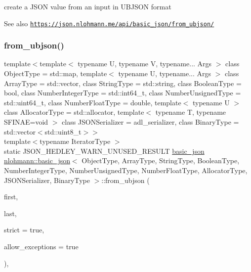 create a J\+S\+ON value from an input in U\+B\+J\+S\+ON format 

\begin{DoxySeeAlso}{See also}
\href{https://json.nlohmann.me/api/basic_json/from_ubjson/}{\tt https\+://json.\+nlohmann.\+me/api/basic\+\_\+json/from\+\_\+ubjson/} 
\end{DoxySeeAlso}
\mbox{\label{classnlohmann_1_1basic__json_a9dbb422350fed520ce8c1ca8762c0251}} 
\subsubsection{\texorpdfstring{from\+\_\+ubjson()}{from\_ubjson()}\hspace{0.1cm}{\footnotesize\ttfamily [2/2]}}
{\footnotesize\ttfamily template$<$template$<$ typename U, typename V, typename... Args $>$ class Object\+Type = std\+::map, template$<$ typename U, typename... Args $>$ class Array\+Type = std\+::vector, class String\+Type  = std\+::string, class Boolean\+Type  = bool, class Number\+Integer\+Type  = std\+::int64\+\_\+t, class Number\+Unsigned\+Type  = std\+::uint64\+\_\+t, class Number\+Float\+Type  = double, template$<$ typename U $>$ class Allocator\+Type = std\+::allocator, template$<$ typename T, typename S\+F\+I\+N\+A\+E=void $>$ class J\+S\+O\+N\+Serializer = adl\+\_\+serializer, class Binary\+Type  = std\+::vector$<$std\+::uint8\+\_\+t$>$$>$ \\
template$<$typename Iterator\+Type $>$ \\
static J\+S\+O\+N\+\_\+\+H\+E\+D\+L\+E\+Y\+\_\+\+W\+A\+R\+N\+\_\+\+U\+N\+U\+S\+E\+D\+\_\+\+R\+E\+S\+U\+LT \hyperlink{classnlohmann_1_1basic__json}{basic\+\_\+json} \hyperlink{classnlohmann_1_1basic__json}{nlohmann\+::basic\+\_\+json}$<$ Object\+Type, Array\+Type, String\+Type, Boolean\+Type, Number\+Integer\+Type, Number\+Unsigned\+Type, Number\+Float\+Type, Allocator\+Type, J\+S\+O\+N\+Serializer, Binary\+Type $>$\+::from\+\_\+ubjson (\begin{DoxyParamCaption}\item[{Iterator\+Type}]{first,  }\item[{Iterator\+Type}]{last,  }\item[{const bool}]{strict = {\ttfamily true},  }\item[{const bool}]{allow\+\_\+exceptions = {\ttfamily true} }\end{DoxyParamCaption})\hspace{0.3cm}{\ttfamily [inline]}, {\ttfamily [static]}}



